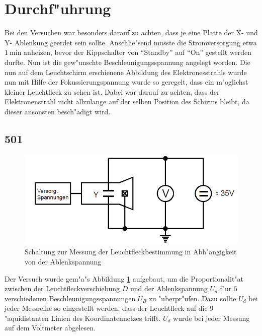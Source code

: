 \section{Durchf"uhrung}
	\label{sec:durchfuehrung}

		Bei den Versuchen war besonders darauf zu achten, dass je eine Platte der X- und Y- Ablenkung geerdet sein sollte. 
		Anschlie"send musste die Stromversorgung etwa $\SI{1}{\minute}$ anheizen, bevor der Kippschalter von "`Standby"' auf "`On"' gestellt werden durfte.
		Nun ist die gew"unschte Be\-schleu\-ni\-gungs\-span\-nun\-g angelegt worden.
		Die nun auf dem Leuchtschirm erschienene Abbildung des Elektronesstrahls wurde nun mit Hilfe der Fokussierungspannung wurde so geregelt, dass ein m"oglichst kleiner Leuchtfleck zu sehen ist.
		Dabei war darauf zu achten, dass der Elektronenstrahl nicht allzulange auf der selben Position des Schirms bleibt, da dieser ansonsten besch"adigt wird.

		\subsection{501}
		\label{sub:501}

		\begin{figure}[h]
			\centering
			\includegraphics[width = 14cm]{501a.png}
			\caption{Schaltung zur Messung der Leuchtfleckbestimmung in Abh"angigkeit von der Ablenkspannung}
			\label{501a}
		\end{figure}

		Der Versuch wurde gem"a"s Abbildung \ref{501a} aufgebaut, um die Proportionalit"at zwischen der Leuchtfleckverschiebung $D$ und der Ablenkspannung $U_d$ f"ur $5$ verschiedenen Be\-schleu\-ni\-gungs\-span\-nun\-gen $U_B$ zu "uberpr"ufen. 
		Dazu sollte $U_d$ bei jeder Messreihe so eingestellt werden, dass der Leuchtfleck auf die $9$ "aquidistanten Linien des Koordinatennetzes trifft.
		$U_d$ wurde bei jeder Messung auf dem Voltmeter abgelesen.

